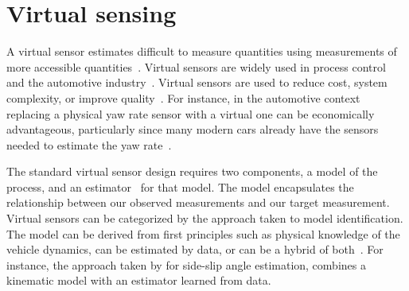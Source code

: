 \documentclass[../main.tex]{subfiles}
\begin{document}

\section{Virtual sensing}

A virtual sensor estimates difficult to measure quantities using measurements of more accessible quantities~\citep{li2011review}. Virtual sensors are widely used in process control~\citep{fortuna2007soft, kadlec2009data} and the automotive industry~\citep{gustafsson2001virtual, shraim2006sliding, doumiati2009virtual}. Virtual sensors are used to reduce cost, system complexity, or improve quality~\citep{rockl2008integration}. For instance, in the automotive context replacing a physical yaw rate sensor with a virtual one can be economically advantageous, particularly since many modern cars already have the sensors needed to estimate the yaw rate~\citep{canale2008study}.

The standard virtual sensor design requires two components, a model of the process, and an estimator~\citep{canale2008study} for that model. The model encapsulates the relationship between our observed measurements and  our target measurement. Virtual sensors can be categorized by the approach taken to model identification. The model can be derived from first principles such as physical knowledge of the vehicle dynamics, can be estimated by data, or can be a hybrid of both~\citep{li2011review}. For instance, the approach taken by \cite{graber2018hybrid} for side-slip angle estimation, combines a kinematic model with an estimator learned from data. 
\end{document}
